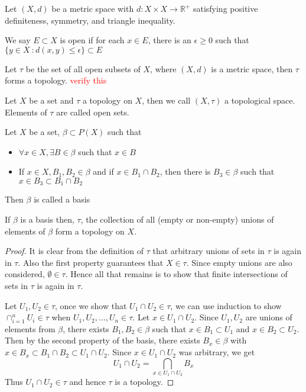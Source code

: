 \begin{definition}
  Let $(X, d)$ be a metric space with $d: X \times X \to \mathbb{R}^+$ satisfying positive definiteness, symmetry, and triangle inequality.
\end{definition}

\begin{definition}
  We say $E \subset X$ is open if for each $x \in E$, there is an $\epsilon \ge 0$ such that $\{ y \in X \ : d(x, y) \le \epsilon \} \subset E$
\end{definition}

\begin{example}
  Let $\tau$ be the set of all open subsets of $X$, where $(X, d)$ is a metric space, then $\tau$ forms a topology. \textcolor{red}{verify this}
\end{example}

\begin{definition}
  Let $X$ be a set and $\tau$ a topology on $X$, then we call $(X, \tau)$ a topological space. Elements of $\tau$ are called open sets.
\end{definition}

\begin{definition}
  Let $X$ be a set, $\beta \subset P(X)$ such that
  \begin{itemize}
    \item $\forall x \in X, \exists B \in \beta$ such that $x \in B$
    \item If $ x \in X, B_1, B_2 \in \beta$ and if $x \in B_1 \cap B_2$, then there is $B_3 \in \beta$ such that $x \in B_3 \subset B_1 \cap B_2$
  \end{itemize}
  Then $ \beta$ is called a basis
\end{definition}

\begin{theorem}
  If $\beta$ is a basis then, $  \tau$, the collection of all (empty or non-empty) unions of elements of $  \beta$ form a topology on $X$.
\end{theorem}
\begin{proof}
  It is clear from the definition of $\tau$ that arbitrary unions of sets in $\tau$ is again in $\tau$. Also the first property guarantees that $X \in \tau$. Since empty unions are also considered, $\emptyset \in \tau$. Hence all that remains is to show that finite intersections of sets in $\tau$ is again in $\tau$.

  Let $U_1, U_2 \in \tau$, once we show that $U_1 \cap U_2 \in \tau$, we can use induction to show $\cap_{i = 1}^{n}U_i \in \tau$ when $U_1, U_2, \ldots , U_n \in \tau$. Let $x \in U_1 \cap U_2$. Since $U_1, U_2$ are unions of elements from $\beta$, there exists $B_1, B_2 \in \beta$ such that $x \in B_1 \subset U_{1}$ and $ x \in  B_2 \subset U_2$. Then by the second property of the basis, there exists $B_x \in \beta$ with $x \in B_x \subset B_1 \cap B_2 \subset U_1 \cap U_2$. Since $x \in U_1 \cap U_2$ was arbitrary, we get \[
       U_1 \cap U_2 = \bigcap_{x \in U_1 \cap U_2} B_x
  \]
  Thus $U_1 \cap U_2 \in \tau$ and hence $\tau$ is a topology.
\end{proof}

